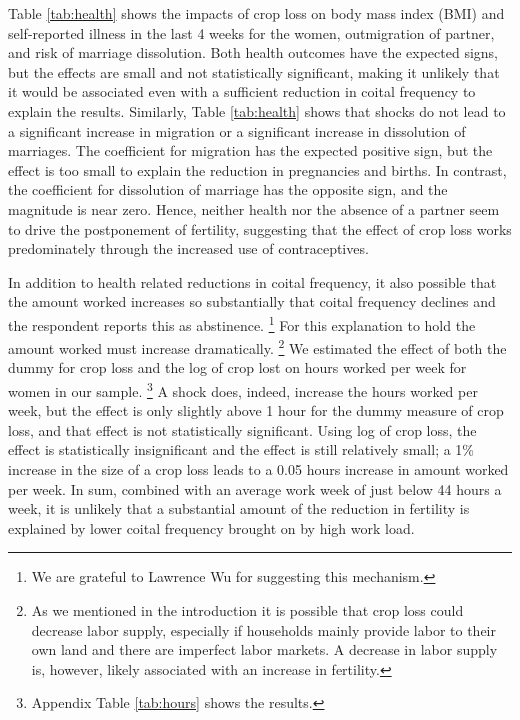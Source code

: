 \documentclass[letterpaper,12pt]{article}
\begin{document}




Table \ref{tab:health} shows the impacts of crop loss on body mass index 
(BMI) and self-reported illness in the last 4 weeks for the women, 
outmigration of partner, and risk of marriage dissolution. 
Both health outcomes have the expected signs, but the effects are small
and not statistically significant, making it unlikely that it 
would be associated even with a sufficient reduction in 
coital frequency to explain the results.
Similarly, Table \ref{tab:health} shows that shocks do not lead to a
significant increase in migration or a significant increase in dissolution of
marriages.
The coefficient for migration has the expected positive sign, but the
effect is too small to explain the reduction in pregnancies and births. 
In contrast, the coefficient for dissolution of marriage has the
opposite sign, and the magnitude is near zero. 
Hence, neither health nor the absence of a partner seem to drive the
postponement of fertility, suggesting that the effect of crop loss 
works predominately through the increased use of contraceptives.


In addition to health related reductions in coital frequency, 
it also possible that the amount worked increases so substantially 
that coital frequency declines and the respondent reports this as abstinence.%
\footnote{
We are grateful to Lawrence Wu for suggesting this mechanism.
}
For this explanation to hold the amount worked must increase 
dramatically.%
\footnote{
As we mentioned in the introduction it is possible that crop loss could
decrease labor supply, especially if households mainly provide labor
to their own land and there are imperfect labor markets.
A decrease in labor supply is, however, likely associated with an
increase in fertility.
}
We estimated the effect of both the dummy for crop loss and the log
of crop lost on hours worked per week for women in our sample.%
\footnote{
Appendix Table \ref{tab:hours} shows the results.
}
A shock does, indeed, increase the hours worked per week, but the 
effect is only slightly above 1 hour for the dummy measure of crop loss, 
and that effect is not statistically significant.
Using log of crop loss, the effect is statistically insignificant
and the effect is still relatively small; 
a 1\% increase in the size of a crop loss leads to a 0.05 hours
increase in amount worked per week.
In sum, combined with an average work week of just below 44 hours a week,
it is unlikely that a substantial amount of the reduction in 
fertility is explained by lower coital frequency brought on by
high work load.
\end{document}
